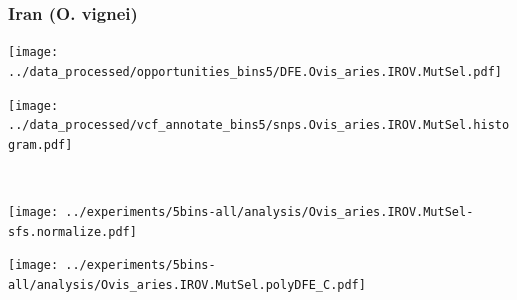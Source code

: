 \subsubsection{Iran (O. vignei)}

\begin{minipage}{0.49\linewidth}
    \texttt{[image: ../data\_processed/opportunities\_bins5/DFE.Ovis\_aries.IROV.MutSel.pdf]}
\end{minipage}
\begin{minipage}{0.49\linewidth}
    \texttt{[image: ../data\_processed/vcf\_annotate\_bins5/snps.Ovis\_aries.IROV.MutSel.histogram.pdf]}
\end{minipage}
\\
\begin{minipage}{0.49\linewidth}
    \texttt{[image: ../experiments/5bins-all/analysis/Ovis\_aries.IROV.MutSel-sfs.normalize.pdf]}
\end{minipage}
\begin{minipage}{0.4\linewidth}
    \texttt{[image: ../experiments/5bins-all/analysis/Ovis\_aries.IROV.MutSel.polyDFE\_C.pdf]}
\end{minipage}

